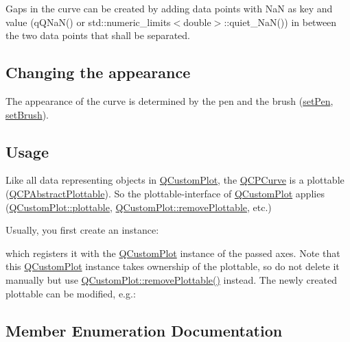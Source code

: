 Gaps in the curve can be created by adding data points with NaN as key and value ({\ttfamily q\+Q\+Na\+N()} or {\ttfamily std\+::numeric\+\_\+limits$<$double$>$\+::quiet\+\_\+\+Na\+N()}) in between the two data points that shall be separated.\hypertarget{classQCPCurve_qcpcurve-appearance}{}\subsection{Changing the appearance}\label{classQCPCurve_qcpcurve-appearance}
The appearance of the curve is determined by the pen and the brush (\hyperlink{classQCPAbstractPlottable_ab74b09ae4c0e7e13142fe4b5bf46cac7}{set\+Pen}, \hyperlink{classQCPAbstractPlottable_a7a4b92144dca6453a1f0f210e27edc74}{set\+Brush}).\hypertarget{classQCPCurve_qcpcurve-usage}{}\subsection{Usage}\label{classQCPCurve_qcpcurve-usage}
Like all data representing objects in \hyperlink{classQCustomPlot}{Q\+Custom\+Plot}, the \hyperlink{classQCPCurve}{Q\+C\+P\+Curve} is a plottable (\hyperlink{classQCPAbstractPlottable}{Q\+C\+P\+Abstract\+Plottable}). So the plottable-\/interface of \hyperlink{classQCustomPlot}{Q\+Custom\+Plot} applies (\hyperlink{classQCustomPlot_a32de81ff53e263e785b83b52ecd99d6f}{Q\+Custom\+Plot\+::plottable}, \hyperlink{classQCustomPlot_af3dafd56884208474f311d6226513ab2}{Q\+Custom\+Plot\+::remove\+Plottable}, etc.)

Usually, you first create an instance\+: 
\begin{DoxyCodeInclude}
\end{DoxyCodeInclude}
which registers it with the \hyperlink{classQCustomPlot}{Q\+Custom\+Plot} instance of the passed axes. Note that this \hyperlink{classQCustomPlot}{Q\+Custom\+Plot} instance takes ownership of the plottable, so do not delete it manually but use \hyperlink{classQCustomPlot_af3dafd56884208474f311d6226513ab2}{Q\+Custom\+Plot\+::remove\+Plottable()} instead. The newly created plottable can be modified, e.\+g.\+: 
\begin{DoxyCodeInclude}
\end{DoxyCodeInclude}


\subsection{Member Enumeration Documentation}
\mbox{\label{classQCPCurve_a2710e9f79302152cff794c6e16cc01f1}} 
